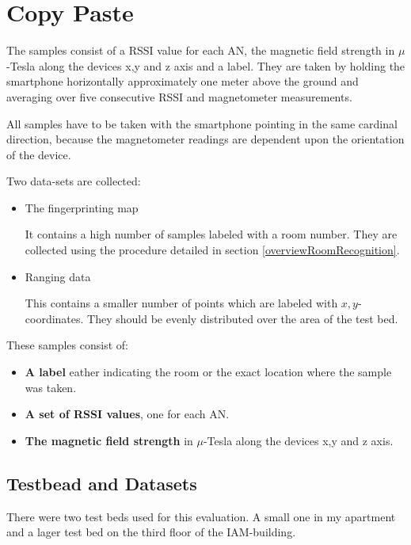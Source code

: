 \chapter{Copy Paste}

The samples consist of a RSSI value for each AN, the magnetic field strength in \(\mu\)-Tesla along the devices x,y and z axis and a label. They are taken by holding the smartphone horizontally approximately one meter above the ground and averaging over five 
consecutive RSSI and magnetometer measurements.

All samples have to be taken with the smartphone pointing in the same cardinal direction, because the magnetometer readings are dependent upon the orientation of the device.


Two data-sets are collected:

\begin{itemize}
\item The fingerprinting map

It contains a high number of samples labeled with a room number. They are collected using the procedure detailed in section \ref{overviewRoomRecognition}.

\item Ranging data

This contains a smaller number of points which are labeled with \(x,y\)-coordinates. They should be evenly distributed over the area of the test bed.
\end{itemize}

These samples consist of:
\begin{itemize}
\item \textbf{A label} eather indicating the room or the exact location where the sample was taken.
\item \textbf{A set of RSSI values}, one for each AN.
\item \textbf{The magnetic field strength} in \(\mu\)-Tesla along the devices x,y and z axis.
\end{itemize}

\section{Testbead and Datasets}

There were two test beds used for this evaluation. A small one in my apartment and a lager test bed on the third floor of the IAM-building.

